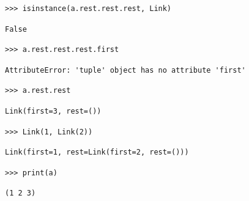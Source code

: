 \begin{blocksection}
\begin{lstlisting}
>>> isinstance(a.rest.rest.rest, Link)
\end{lstlisting}
\begin{solution}[.35in]
\begin{lstlisting}
False
\end{lstlisting}
\end{solution}
\end{blocksection}

\begin{blocksection}
\begin{lstlisting}
>>> a.rest.rest.rest.first
\end{lstlisting}
\begin{solution}[.35in]
\begin{lstlisting}
AttributeError: 'tuple' object has no attribute 'first'
\end{lstlisting}
\end{solution}
\end{blocksection}

\begin{blocksection}
\begin{lstlisting}
>>> a.rest.rest
\end{lstlisting}
\begin{solution}[.35in]
\begin{lstlisting}
Link(first=3, rest=())
\end{lstlisting}
\end{solution}
\end{blocksection}

\begin{blocksection}
\begin{lstlisting}
>>> Link(1, Link(2))
\end{lstlisting}
\begin{solution}[.35in]
\begin{lstlisting}
Link(first=1, rest=Link(first=2, rest=()))
\end{lstlisting}
\end{solution}
\end{blocksection}

\begin{blocksection}
\begin{lstlisting}
>>> print(a)
\end{lstlisting}
\begin{solution}[.35in]
\begin{lstlisting}
(1 2 3)
\end{lstlisting}
\end{solution}
\end{blocksection}

